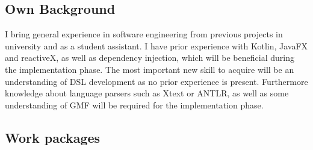 \documentclass[10pt,a4paper,oneside]{scrartcl}
\newcommand\hint[2]{
\ifthenelse{\boolean{showhints}}{
\begin{center}
\colorbox{black!10}{
\begin{minipage}{.963\textwidth}
#2\hfill\textbf{#1}
\end{minipage}
}\end{center}}{}
}
\begin{document}
\subsection{Own Background}
\label{sub:background}


I bring general experience in software engineering from previous projects in university and as a student assistant. I have prior experience with Kotlin, JavaFX and reactiveX, as well as dependency injection, which will be beneficial during the implementation phase. The most important new skill to acquire will be an understanding of DSL development as no prior experience is present. Furthermore knowledge about language parsers such as Xtext or ANTLR, as well as some understanding of GMF will be required for the implementation phase.



\subsection{Work packages}
\label{sub:wp}

\end{document}
